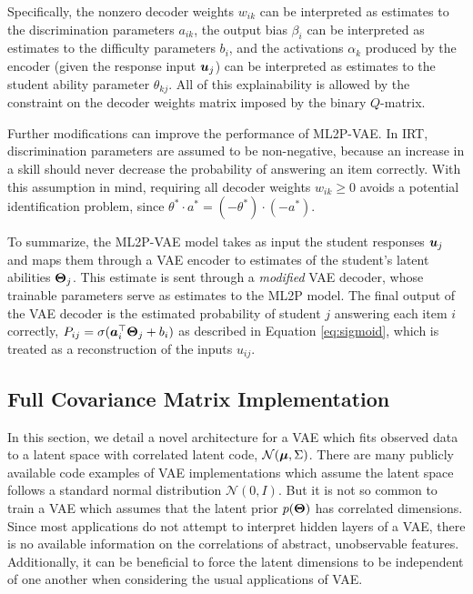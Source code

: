 Specifically, the nonzero decoder weights $w_{ik}$ can be interpreted as estimates to the discrimination parameters $a_{ik}$, the output bias $\beta_i$ can be interpreted as estimates to the difficulty parameters $b_i$, and the activations $\alpha_k$ produced by the encoder (given the response input $\boldsymbol{u}_j$) can be interpreted as estimates to the student ability parameter $\theta_{kj}$. All of this explainability is allowed by the constraint on the decoder weights matrix imposed by the binary $Q$-matrix.

Further modifications can improve the performance of ML2P-VAE. In IRT, discrimination parameters are assumed to be non-negative, because an increase in a skill should never decrease the probability of answering an item correctly. With this assumption in mind, requiring all decoder weights $w_{ik} \geq 0$ avoids a potential identification problem, since $\theta^* \cdot a^* = (-\theta^*)\cdot(-a^*)$.

To summarize, the ML2P-VAE model takes as input the student responses $\boldsymbol{u}_j$ and maps them through a VAE encoder to estimates of the student's latent abilities $\boldsymbol{\Theta}_j$. This estimate is sent through a \textit{modified} VAE decoder, whose trainable parameters serve as estimates to the ML2P model. The final output of the VAE decoder is the estimated probability of student $j$ answering each item $i$ correctly, $P_{ij} = \sigma(\boldsymbol{a}_i^\top \boldsymbol{\Theta}_j + b_i)$ as described in Equation \ref{eq:sigmoid}, which is treated as a reconstruction of the inputs $u_{ij}$.


\subsection{Full Covariance Matrix Implementation}\label{sec:cov}
In this section, we detail a novel architecture for a VAE which fits observed data to a latent space with correlated latent code, $\mathcal{N}(\boldsymbol{\mu}, \Sigma)$. There are many publicly available code examples of VAE implementations which assume the latent space follows a standard normal distribution $\mathcal{N}(0,I)$. But it is not so common to train a VAE which assumes that the latent prior $p(\boldsymbol{\Theta})$ has correlated dimensions. Since most applications do not attempt to interpret hidden layers of a VAE, there is no available information on the correlations of abstract, unobservable features. Additionally, it can be beneficial to force the latent dimensions to be independent of one another when considering the usual applications of VAE.


